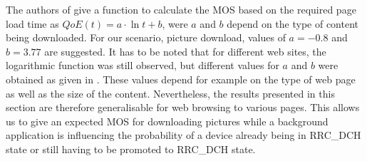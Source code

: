 The authors of \cite{egger2012a} give a function to calculate the \gls{MOS} based on the required page load time as \(QoE(t) = a\cdot \ln t + b\), were \(a\) and \(b\) depend on the type of content being downloaded.
For our scenario, picture download, values of \(a = -0.8\) and \(b = 3.77\) are suggested.
It has to be noted that for different web sites, the logarithmic function was still observed, but different values for \(a\) and \(b\) were obtained as given in \cite{egger2012a}.
These values depend for example on the type of web page as well as the size of the content.
Nevertheless, the results presented in this section are therefore generalisable for web browsing to various pages.
This allows us to give an expected \gls{MOS} for downloading pictures while a background application is influencing the probability of a device already being in \gls{RRC_DCH} state or still having to be promoted to \gls{RRC_DCH} state.

